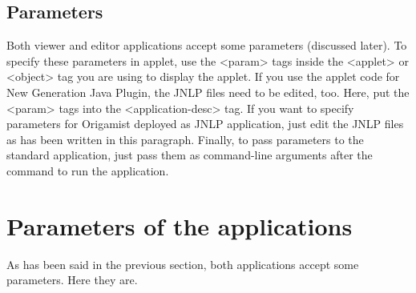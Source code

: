 \subsection{Parameters}
Both viewer and editor applications accept some parameters (discussed later). To specify these parameters in applet, use the <param> tags inside the <applet> or <object> tag you are using to display the applet. If you use the applet code for New Generation Java Plugin, the JNLP files need to be edited, too. Here, put the <param> tags into the <application-desc> tag. If you want to specify parameters for Origamist deployed as JNLP application, just edit the JNLP files as has been written in this paragraph. Finally, to pass parameters to the standard application, just pass them as command-line arguments after the command to run the application.

\section{Parameters of the applications}
As has been said in the previous section, both applications accept some parameters. Here they are.

